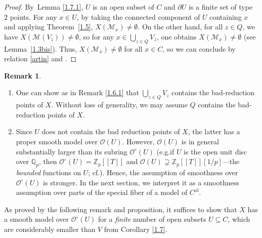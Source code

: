 \documentclass[10pt]{amsart}
\newcommand{\eg}{e.g.}
\newcommand{\cf}{cf.}
\newcommand{\skpt}{\par\smallskip}
\newcommand{\lcr}{[\![}
\newcommand{\rcr}{]\!]}
\newcommand{\al}{\mathrm{al}}
\theoremstyle{definition}
\newtheorem{rem}[thm]{Remark}
\begin{document}
\begin{proof}
By~Lemma \ref{1.7.1}, $U$ is an open subset of $C$ and $\partial{U}$ is a finite set of type~$2$ points.
For any $x \in U$, by taking the connected component of $U$ containing $x$ and applying Theorem~\ref{1.5}, $X(\mathscr{M}_x) \neq \emptyset$.
On the other hand, for all $z \in Q$, we have $X(\mathscr{M}(V_z)) \neq \emptyset$, so for any $x \in \bigcup_{z\in Q} V_z$, one obtains $X(\mathscr{M}_x) \neq \emptyset$ (see Lemma~\ref{1.3bis}). Thus, $X(\mathscr{M}_x) \neq \emptyset$ for all $x \in C$, so we can conclude by relation \eqref{artin} and \cite[Cor.\,3.18]{une}.
\end{proof}

\skpt
\begin{rem} \label{1.8}
\begin{enumerate}
\item
One can show as in Remark \ref{1.6.1} that $\bigcup_{z \in Q} V_z$ contains the bad-reduction points of $X$. Without loss of generality, we may assume $Q$ contains the bad-reduction points of $X$.

\item
Since $U$ does not contain the bad reduction points of $X$, the latter has a proper smooth model over $\mathcal{O}(U)$. However, $\mathcal{O}(U)$ is in general substantially larger than its subring $\mathcal{O}^{\circ}(U)$ (\eg if $U$ is the open unit disc over $\mathbb{Q}_p$, then $\mathcal{O}^{\circ}(U)=\mathbb{Z}_p\lcr T\rcr$ and $\mathcal{O}(U) \supsetneq \mathbb{Z}_p\lcr T\rcr[1/p]$---the \emph{bounded} functions on $U$; \cf \cite{mart}). Hence, the assumption of smoothness over $\mathcal{O}^{\circ}(U)$ is stronger.
In the next section, we interpret it as a smoothness assumption over parts of the special fiber of a model of $C^{\al}$.
\end{enumerate}
\end{rem}

As proved by the following remark and proposition, it suffices to show that $X$ has a smooth model over $\mathcal{O}^{\circ}(U)$ for a \emph{finite} number of open subsets $U \subseteq C$, which are considerably smaller than $V$ from Corollary \ref{1.7}.\enlargethispage{\baselineskip}
\end{document}
